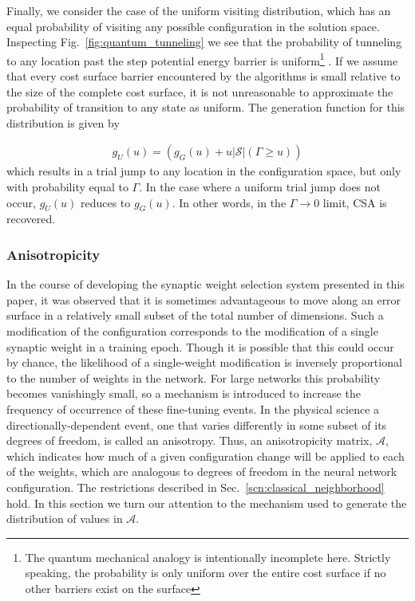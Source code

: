 \documentclass[11pt]{afthesis}
\begin{document}
	
	Finally, we consider the case of the uniform visiting distribution, which has an equal probability of visiting any possible configuration in the solution space. Inspecting Fig.~\ref{fig:quantum_tunneling} we see that the probability of tunneling to any location past the step potential energy barrier is uniform\footnote{The quantum mechanical analogy is intentionally incomplete here. Strictly speaking, the probability is only uniform over the entire cost surface if no other barriers exist on the surface} . If we assume that every cost surface barrier encountered by the algorithms is small relative to the size of the complete cost surface, it is not unreasonable to approximate the probability of transition to any state as uniform. The generation function for this distribution is given by
	
	\begin{align}\label{eq:uniform_generation_fcn}
	g_{U}(u) = (g_{G}(u) +  u \left| \boldsymbol{\mathcal{S}} \right| (\Gamma\geq u))
	\end{align}
	\noindent which results in a trial jump to any location in the configuration space, but only with probability equal to $\Gamma$. In the case where a uniform trial jump does not occur, $g_{U}(u)$ reduces to $g_{G}(u)$. In other words, in the $\Gamma \rightarrow 0$ limit, CSA is recovered.
	
	\subsubsection{Anisotropicity}
	\label{scn:anisotropicity}
	In the course of developing the synaptic weight selection system presented in this paper, it was observed that it is sometimes advantageous to move along an error surface in a relatively small subset of the total number of dimensions. Such a modification of the configuration corresponds to the modification of a single synaptic weight in a training epoch. Though it is possible that this could occur by chance, the likelihood of a single-weight modification is inversely proportional to the number of weights in the network. For large networks this probability becomes vanishingly small, so a mechanism is introduced to increase the frequency of occurrence of these fine-tuning events. In the physical science a directionally-dependent event, one that varies differently in some subset of its degrees of freedom, is called an anisotropy. Thus, an anisotropicity matrix, $\boldsymbol{\mathcal{A}}$, which indicates how much of a given configuration change will be applied to each of the weights, which are analogous to degrees of freedom in the neural network configuration. The restrictions described in Sec.~\ref{scn:classical_neighborhood} hold. In this section we turn our attention to the mechanism used to generate the distribution of values in $\boldsymbol{\mathcal{A}}$. 
	
\end{document}
